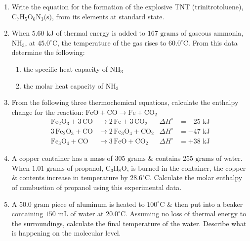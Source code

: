 \documentclass[12pt]{article}
\begin{document}
\begin{enumerate}[label=\arabic*.]
    \item Write the equation for the formation of the explosive TNT (trinitrotoluene), $\text{C}_7\text{H}_5\text{O}_6\text{N}_3\text{(s)}$, from its elements at standard state.
    \vspace{3.5cm}

    \item When $5.60\text{ kJ}$ of thermal energy is added to $167\text{ grams}$ of gaseous ammonia, $\text{NH}_3$, at $45.0^\circ\text{C}$, the temperature of the gas rises to $60.0^\circ\text{C}$. From this data determine the following:
    \begin{enumerate}[label=\alph*)]
        \item the specific heat capacity of $\text{NH}_3$
        \vspace{2.5cm}
        \item the molar heat capacity of $\text{NH}_3$
        \vspace{2.5cm}
    \end{enumerate}

    \item From the following three thermochemical equations, calculate the enthalpy change for the reaction: $\text{FeO} + \text{CO} \rightarrow \text{Fe} + \text{CO}_2$
    \begin{align*}
    \text{Fe}_2\text{O}_3 + 3\,\text{CO} &\rightarrow 2\,\text{Fe} + 3\,\text{CO}_2 & \Delta H^\circ &= -25\text{ kJ} \\
    3\,\text{Fe}_2\text{O}_3 + \text{CO} &\rightarrow 2\,\text{Fe}_3\text{O}_4 + \text{CO}_2 & \Delta H^\circ &= -47\text{ kJ} \\
    \text{Fe}_3\text{O}_4 + \text{CO} &\rightarrow 3\,\text{FeO} + \text{CO}_2 & \Delta H^\circ &= +38\text{ kJ}
    \end{align*}
    \vspace{5cm}

    \item A copper container has a mass of $305\text{ grams}$ \& contains $255\text{ grams}$ of water. When $1.01\text{ grams}$ of propanol, $\text{C}_3\text{H}_8\text{O}$, is burned in the container, the copper \& contents increase in temperature by $28.6^\circ\text{C}$. Calculate the molar enthalpy of combustion of propanol using this experimental data.
    \vspace{4.5cm}

    \item A $50.0\text{ gram}$ piece of aluminum is heated to $100^\circ\text{C}$ \& then put into a beaker containing $150\text{ mL}$ of water at $20.0^\circ\text{C}$. Assuming no loss of thermal energy to the surroundings, calculate the final temperature of the water. Describe what is happening on the molecular level.
    \vspace{4.5cm}


\end{enumerate}
\end{document}
